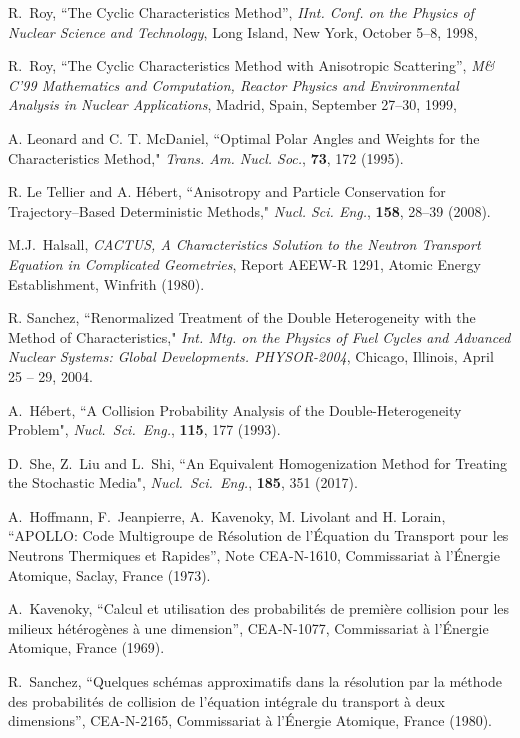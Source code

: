 \begin{thebibliography}{99}
R.~Roy, 
``The Cyclic Characteristics Method'', 
{\sl IInt. Conf. on the Physics of Nuclear Science and Technology}, 
Long Island, New York, October 5--8, 1998,

R.~Roy, 
``The Cyclic Characteristics Method with Anisotropic Scattering'', 
\textsl{M\& C'99 Mathematics and Computation, Reactor Physics and Environmental Analysis
in Nuclear Applications}, Madrid, Spain, September  27--30, 1999,

A. Leonard and C. T. McDaniel, ``Optimal Polar Angles and Weights for the
Characteristics Method," \textsl{Trans. Am. Nucl. Soc.}, \textbf{73}, 172 (1995).

R. Le Tellier and A. H\'ebert, ``Anisotropy and Particle Conservation for Trajectory--Based 
Deterministic Methods," {\sl Nucl. Sci. Eng.}, {\bf 158}, 28--39 (2008).

M.J.~Halsall, 
\textsl{CACTUS, A Characteristics Solution to the Neutron Transport 
Equation in Complicated Geometries}, 
Report AEEW-R 1291, Atomic Energy Establishment,
Winfrith (1980).

R. Sanchez, ``Renormalized Treatment of the Double Heterogeneity with
the Method of Characteristics,"
{\sl Int. Mtg. on the Physics of Fuel Cycles and Advanced Nuclear Systems:
Global Developments. PHYSOR-2004}, Chicago, Illinois, April 25 -- 29, 2004.

A.~H\'ebert, ``A Collision Probability Analysis of the Double-Heterogeneity
Problem", {\sl Nucl.~Sci.~Eng.}, {\bf 115}, 177 (1993).

D.~She, Z.~Liu and L.~Shi, ``An Equivalent Homogenization Method for Treating the Stochastic Media", 
{\sl Nucl.~Sci.~Eng.}, {\bf 185}, 351 (2017).

A.~Hoffmann, F.~Jeanpierre, A.~Kavenoky, M. Livolant and H. Lorain,
``APOLLO: Code Multigroupe de R\'esolution de l'\'Equation du Transport
pour les Neutrons Thermiques et Rapides'', Note CEA-N-1610, Commissariat
\`a l'\'Energie Atomique, Saclay, France (1973).

A.~Kavenoky, ``Calcul et utilisation des probabilit\'es de premi\`ere collision
pour les milieux h\'et\'erog\`enes \`a  une dimension'', CEA-N-1077,
Commissariat \`a l'\'Energie Atomique, France (1969).

R.~Sanchez, ``Quelques sch\'emas approximatifs dans la r\'esolution
par la m\'ethode des probabilit\'es de collision de l'\'equation
int\'egrale du transport \`a deux dimensions'', CEA-N-2165,
Commissariat \`a l'\'Energie Atomique, France (1980).


\end{thebibliography}

